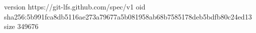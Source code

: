 version https://git-lfs.github.com/spec/v1
oid sha256:5b991fca8db5116ae273a79677a5b081958ab68b7585178deb5bdfb80c24ed13
size 349676
